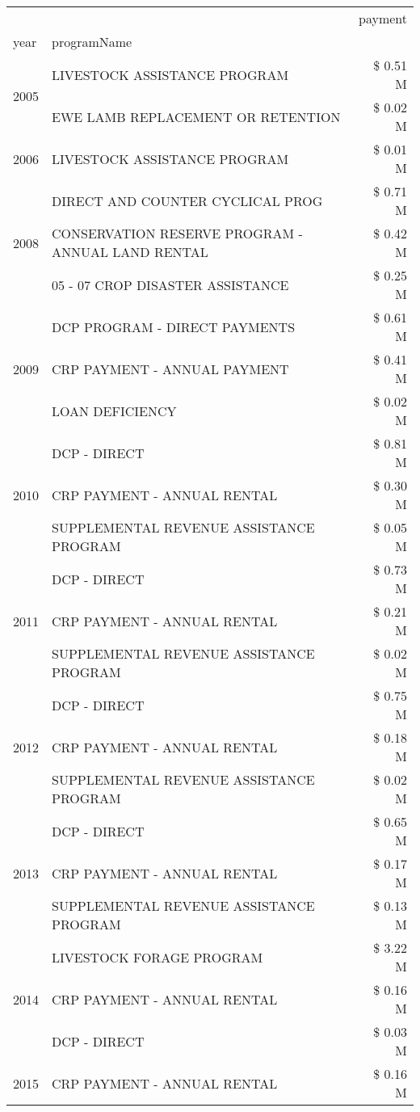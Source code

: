 \begin{tabular}{llr}
\toprule
 &  & payment \\
year & programName &  \\
\midrule
\multirow[t]{2}{*}{2005} & LIVESTOCK ASSISTANCE PROGRAM & \$ 0.51 M \\
 & EWE LAMB REPLACEMENT OR RETENTION & \$ 0.02 M \\
\cline{1-3}
2006 & LIVESTOCK ASSISTANCE PROGRAM & \$ 0.01 M \\
\cline{1-3}
\multirow[t]{3}{*}{2008} & DIRECT AND COUNTER CYCLICAL PROG & \$ 0.71 M \\
 & CONSERVATION RESERVE PROGRAM - ANNUAL LAND RENTAL & \$ 0.42 M \\
 & 05 - 07 CROP DISASTER ASSISTANCE & \$ 0.25 M \\
\cline{1-3}
\multirow[t]{3}{*}{2009} & DCP PROGRAM - DIRECT PAYMENTS & \$ 0.61 M \\
 & CRP PAYMENT - ANNUAL PAYMENT & \$ 0.41 M \\
 & LOAN DEFICIENCY & \$ 0.02 M \\
\cline{1-3}
\multirow[t]{3}{*}{2010} & DCP - DIRECT & \$ 0.81 M \\
 & CRP PAYMENT - ANNUAL RENTAL & \$ 0.30 M \\
 & SUPPLEMENTAL REVENUE ASSISTANCE PROGRAM & \$ 0.05 M \\
\cline{1-3}
\multirow[t]{3}{*}{2011} & DCP - DIRECT & \$ 0.73 M \\
 & CRP PAYMENT - ANNUAL RENTAL & \$ 0.21 M \\
 & SUPPLEMENTAL REVENUE ASSISTANCE PROGRAM & \$ 0.02 M \\
\cline{1-3}
\multirow[t]{3}{*}{2012} & DCP - DIRECT & \$ 0.75 M \\
 & CRP PAYMENT - ANNUAL RENTAL & \$ 0.18 M \\
 & SUPPLEMENTAL REVENUE ASSISTANCE PROGRAM & \$ 0.02 M \\
\cline{1-3}
\multirow[t]{3}{*}{2013} & DCP - DIRECT & \$ 0.65 M \\
 & CRP PAYMENT - ANNUAL RENTAL & \$ 0.17 M \\
 & SUPPLEMENTAL REVENUE ASSISTANCE PROGRAM & \$ 0.13 M \\
\cline{1-3}
\multirow[t]{3}{*}{2014} & LIVESTOCK FORAGE PROGRAM & \$ 3.22 M \\
 & CRP PAYMENT - ANNUAL RENTAL & \$ 0.16 M \\
 & DCP - DIRECT & \$ 0.03 M \\
\cline{1-3}
\multirow[t]{3}{*}{2015} & CRP PAYMENT - ANNUAL RENTAL & \$ 0.16 M \\

\end{tabular}
